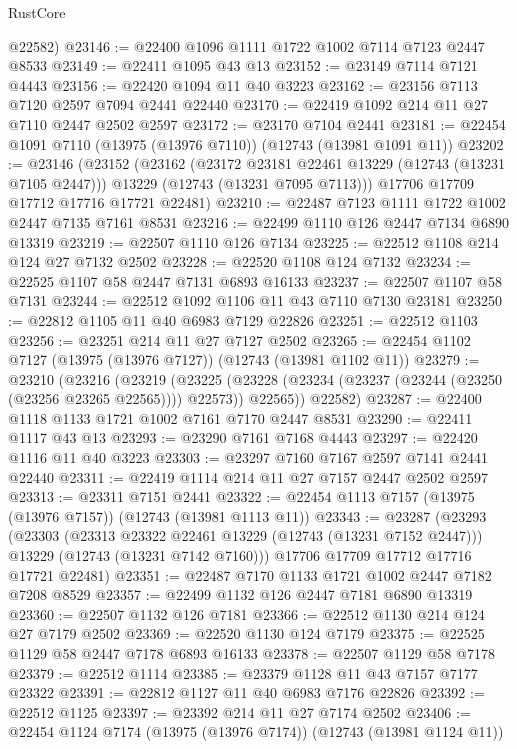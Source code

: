 \begin{lexlean}{RustCore}
\begin{coremodule}
      @22582)
@23146 := @22400 @1096 @1111 @1722 @1002 @7114 @7123 @2447 @8533
@23149 := @22411 @1095 @43 @13
@23152 := @23149 @7114 @7121 @4443
@23156 := @22420 @1094 @11 @40 @3223
@23162 := @23156 @7113 @7120 @2597 @7094 @2441 @22440
@23170 := @22419 @1092 @214 @11 @27 @7110 @2447 @2502 @2597
@23172 := @23170 @7104 @2441
@23181 := @22454 @1091 @7110 (@13975 (@13976 @7110)) (@12743 (@13981 @1091 @11))
@23202 := @23146
    (@23152
      (@23162
        (@23172 @23181 @22461 @13229 (@12743 (@13231 @7105 @2447)))
        @13229
        (@12743 (@13231 @7095 @7113)))
      @17706
      @17709
      @17712
      @17716
      @17721
      @22481)
@23210 := @22487 @7123 @1111 @1722 @1002 @2447 @7135 @7161 @8531
@23216 := @22499 @1110 @126 @2447 @7134 @6890 @13319
@23219 := @22507 @1110 @126 @7134
@23225 := @22512 @1108 @214 @124 @27 @7132 @2502
@23228 := @22520 @1108 @124 @7132
@23234 := @22525 @1107 @58 @2447 @7131 @6893 @16133
@23237 := @22507 @1107 @58 @7131
@23244 := @22512 @1092 @1106 @11 @43 @7110 @7130 @23181
@23250 := @22812 @1105 @11 @40 @6983 @7129 @22826
@23251 := @22512 @1103
@23256 := @23251 @214 @11 @27 @7127 @2502
@23265 := @22454 @1102 @7127 (@13975 (@13976 @7127)) (@12743 (@13981 @1102 @11))
@23279 := @23210
    (@23216
      (@23219
        (@23225 (@23228 (@23234 (@23237 (@23244 (@23250 (@23256 @23265 @22565)))) @22573)) @22565))
      @22582)
@23287 := @22400 @1118 @1133 @1721 @1002 @7161 @7170 @2447 @8531
@23290 := @22411 @1117 @43 @13
@23293 := @23290 @7161 @7168 @4443
@23297 := @22420 @1116 @11 @40 @3223
@23303 := @23297 @7160 @7167 @2597 @7141 @2441 @22440
@23311 := @22419 @1114 @214 @11 @27 @7157 @2447 @2502 @2597
@23313 := @23311 @7151 @2441
@23322 := @22454 @1113 @7157 (@13975 (@13976 @7157)) (@12743 (@13981 @1113 @11))
@23343 := @23287
    (@23293
      (@23303
        (@23313 @23322 @22461 @13229 (@12743 (@13231 @7152 @2447)))
        @13229
        (@12743 (@13231 @7142 @7160)))
      @17706
      @17709
      @17712
      @17716
      @17721
      @22481)
@23351 := @22487 @7170 @1133 @1721 @1002 @2447 @7182 @7208 @8529
@23357 := @22499 @1132 @126 @2447 @7181 @6890 @13319
@23360 := @22507 @1132 @126 @7181
@23366 := @22512 @1130 @214 @124 @27 @7179 @2502
@23369 := @22520 @1130 @124 @7179
@23375 := @22525 @1129 @58 @2447 @7178 @6893 @16133
@23378 := @22507 @1129 @58 @7178
@23379 := @22512 @1114
@23385 := @23379 @1128 @11 @43 @7157 @7177 @23322
@23391 := @22812 @1127 @11 @40 @6983 @7176 @22826
@23392 := @22512 @1125
@23397 := @23392 @214 @11 @27 @7174 @2502
@23406 := @22454 @1124 @7174 (@13975 (@13976 @7174)) (@12743 (@13981 @1124 @11))

\end{coremodule}
\end{lexlean}
